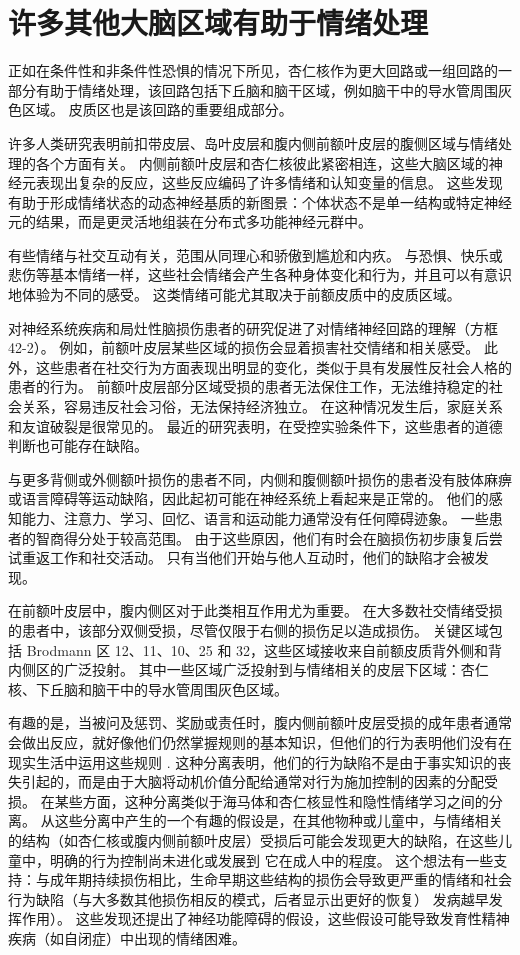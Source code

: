 \section{许多其他大脑区域有助于情绪处理}
正如在条件性和非条件性恐惧的情况下所见，杏仁核作为更大回路或一组回路的一部分有助于情绪处理，该回路包括下丘脑和脑干区域，例如脑干中的导水管周围灰色区域。 皮质区也是该回路的重要组成部分。

许多人类研究表明前扣带皮层、岛叶皮层和腹内侧前额叶皮层的腹侧区域与情绪处理的各个方面有关。 内侧前额叶皮层和杏仁核彼此紧密相连，这些大脑区域的神经元表现出复杂的反应，这些反应编码了许多情绪和认知变量的信息。 这些发现有助于形成情绪状态的动态神经基质的新图景：个体状态不是单一结构或特定神经元的结果，而是更灵活地组装在分布式多功能神经元群中。

有些情绪与社交互动有关，范围从同理心和骄傲到尴尬和内疚。 与恐惧、快乐或悲伤等基本情绪一样，这些社会情绪会产生各种身体变化和行为，并且可以有意识地体验为不同的感受。 这类情绪可能尤其取决于前额皮质中的皮质区域。

对神经系统疾病和局灶性脑损伤患者的研究促进了对情绪神经回路的理解（方框 42-2）。 例如，前额叶皮层某些区域的损伤会显着损害社交情绪和相关感受。 此外，这些患者在社交行为方面表现出明显的变化，类似于具有发展性反社会人格的患者的行为。 前额叶皮层部分区域受损的患者无法保住工作，无法维持稳定的社会关系，容易违反社会习俗，无法保持经济独立。 在这种情况发生后，家庭关系和友谊破裂是很常见的。 最近的研究表明，在受控实验条件下，这些患者的道德判断也可能存在缺陷。

与更多背侧或外侧额叶损伤的患者不同，内侧和腹侧额叶损伤的患者没有肢体麻痹或语言障碍等运动缺陷，因此起初可能在神经系统上看起来是正常的。 他们的感知能力、注意力、学习、回忆、语言和运动能力通常没有任何障碍迹象。 一些患者的智商得分处于较高范围。 由于这些原因，他们有时会在脑损伤初步康复后尝试重返工作和社交活动。 只有当他们开始与他人互动时，他们的缺陷才会被发现。

在前额叶皮层中，腹内侧区对于此类相互作用尤为重要。 在大多数社交情绪受损的患者中，该部分双侧受损，尽管仅限于右侧的损伤足以造成损伤。 关键区域包括 Brodmann 区 12、11、10、25 和 32，这些区域接收来自前额皮质背外侧和背内侧区的广泛投射。 其中一些区域广泛投射到与情绪相关的皮层下区域：杏仁核、下丘脑和脑干中的导水管周围灰色区域。

有趣的是，当被问及惩罚、奖励或责任时，腹内侧前额叶皮层受损的成年患者通常会做出反应，就好像他们仍然掌握规则的基本知识，但他们的行为表明他们没有在现实生活中运用这些规则 . 这种分离表明，他们的行为缺陷不是由于事实知识的丧失引起的，而是由于大脑将动机价值分配给通常对行为施加控制的因素的分配受损。 在某些方面，这种分离类似于海马体和杏仁核显性和隐性情绪学习之间的分离。 从这些分离中产生的一个有趣的假设是，在其他物种或儿童中，与情绪相关的结构（如杏仁核或腹内侧前额叶皮层）受损后可能会发现更大的缺陷，在这些儿童中，明确的行为控制尚未进化或发展到 它在成人中的程度。 这个想法有一些支持：与成年期持续损伤相比，生命早期这些结构的损伤会导致更严重的情绪和社会行为缺陷（与大多数其他损伤相反的模式，后者显示出更好的恢复） 发病越早发挥作用）。 这些发现还提出了神经功能障碍的假设，这些假设可能导致发育性精神疾病（如自闭症）中出现的情绪困难。

